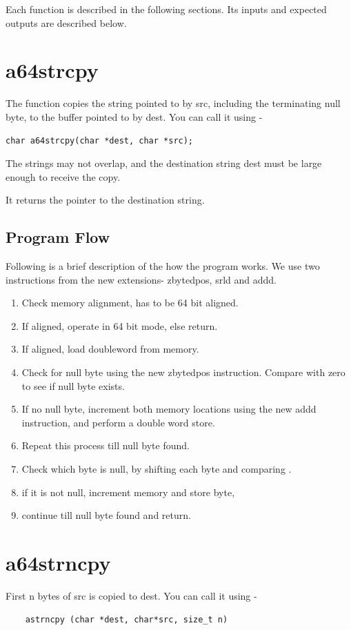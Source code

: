 \documentclass[12pt]{article}
\begin{document}
Each function is described in the following sections. Its inputs and expected outputs are described below.


\section{a64strcpy}
The function copies the string pointed to by src, including the terminating null byte, to the buffer pointed to by dest. You can call it using -
\begin{verbatim}
char a64strcpy(char *dest, char *src);
\end{verbatim}
The strings may not overlap, and the destination string dest must be large enough to receive the copy.

It returns the pointer to the destination string.


\subsection{Program Flow}

Following is a brief description of the how the program works. We use two instructions from the new extensions- zbytedpos, srld and addd. 

\begin{enumerate}
    \item Check memory alignment, has to be 64 bit aligned.
    \item If aligned, operate in 64 bit mode, else return.
    \item If aligned, load doubleword from memory.
    \item Check for null byte using the new zbytedpos instruction. Compare with zero to see if null byte exists.
    \item If no null byte, increment both memory locations using the new addd instruction, and perform a double word store.
    \item Repeat this process till null byte found.
    \item Check which byte is null, by shifting each byte and comparing .
    \item if it is not null, increment memory and store byte,
    \item continue till null byte found and return.
\end{enumerate}

\section{a64strncpy}
First n bytes of src is copied to dest. You can call it using -
\begin{verbatim}
    astrncpy (char *dest, char*src, size_t n)
\end{verbatim}
\end{document}
